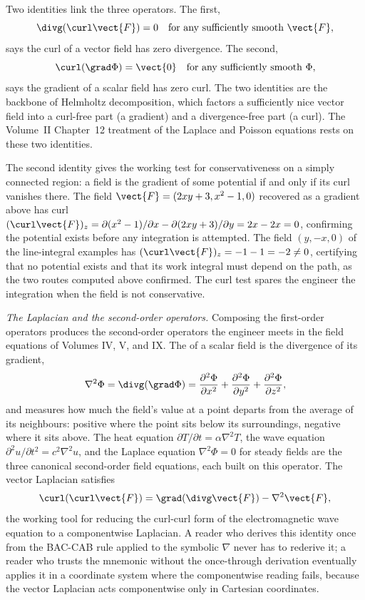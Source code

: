 Two identities link the three operators. The first,
\[
\divg(\curl\vect{F}) = 0
\quad\text{for any sufficiently smooth } \vect{F},
\]
says the curl of a vector field has zero divergence. The second,
\[
\curl(\grad\Phi) = \vect{0}
\quad\text{for any sufficiently smooth } \Phi,
\]
says the gradient of a scalar field has zero curl. The two identities
are the backbone of Helmholtz decomposition, which factors a
sufficiently nice vector field into a curl-free part (a gradient)
and a divergence-free part (a curl). The Volume~II Chapter~12
treatment of the Laplace and Poisson equations rests on these two
identities.

The second identity gives the working test for conservativeness on a
simply connected region: a field is the gradient of some potential if
and only if its curl vanishes there. The field $\vect{F} = (2xy + 3,
x^{2} - 1, 0)$ recovered as a gradient above has curl $(\curl
\vect{F})_{z} = \partial(x^{2} - 1)/\partial x - \partial(2xy + 3)/
\partial y = 2x - 2x = 0$, confirming the potential exists before any
integration is attempted. The field $(y, -x, 0)$ of the line-integral
examples has $(\curl\vect{F})_{z} = -1 - 1 = -2 \neq 0$, certifying
that no potential exists and that its work integral must depend on the
path, as the two routes computed above confirmed. The curl test
spares the engineer the integration when the field is not
conservative.

\begin{mastery}
\textit{The Laplacian and the second-order operators.} Composing the
first-order operators produces the second-order operators the
engineer meets in the field equations of Volumes IV, V, and IX. The
 of a scalar field is the divergence of its
gradient,
\[
\nabla^{2}\Phi = \divg(\grad\Phi) =
\frac{\partial^{2}\Phi}{\partial x^{2}} +
\frac{\partial^{2}\Phi}{\partial y^{2}} +
\frac{\partial^{2}\Phi}{\partial z^{2}},
\]
and measures how much the field's value at a point departs from the
average of its neighbours: positive where the point sits below its
surroundings, negative where it sits above. The heat equation
$\partial T/\partial t = \alpha\nabla^{2}T$, the wave equation
$\partial^{2}u/\partial t^{2} = c^{2}\nabla^{2}u$, and the Laplace
equation $\nabla^{2}\Phi = 0$ for steady fields are the three
canonical second-order field equations, each built on this operator.
The vector Laplacian satisfies
\[
\curl(\curl\vect{F}) = \grad(\divg\vect{F}) - \nabla^{2}\vect{F},
\]
the working tool for reducing the curl-curl form of the
electromagnetic wave equation to a componentwise Laplacian. A reader
who derives this identity once from the BAC-CAB rule applied to the
symbolic $\nabla$ never has to rederive it; a reader who trusts the
mnemonic without the once-through derivation eventually applies it in
a coordinate system where the componentwise reading fails, because
the vector Laplacian acts componentwise only in Cartesian
coordinates.
\end{mastery}

